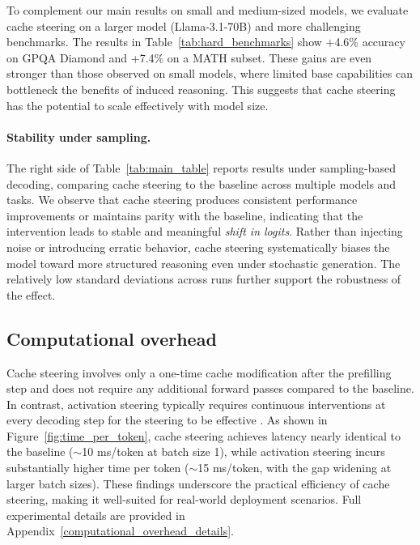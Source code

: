 \documentclass{article} %
\begin{document}
To complement our main results on small and medium-sized models, we evaluate cache steering on a larger model (Llama-3.1-70B) and more challenging benchmarks. The results in Table~\ref{tab:hard_benchmarks} show +4.6\% accuracy on GPQA Diamond and +7.4\% on a MATH subset. These gains are even stronger than those observed on small models, where limited base capabilities can bottleneck the benefits of induced reasoning. This suggests that cache steering has the potential to scale effectively with model size. 





\paragraph{Stability under sampling.}
The right side of Table~\ref{tab:main_table} reports results under sampling-based decoding, comparing cache steering to the baseline across multiple models and tasks. We observe that cache steering produces consistent performance improvements or maintains parity with the baseline, indicating that the intervention leads to stable and meaningful \textit{shift in logits}. Rather than injecting noise or introducing erratic behavior, cache steering systematically biases the model toward more structured reasoning even under stochastic generation. The relatively low standard deviations across runs further support the robustness of the effect.

\subsection{Computational overhead} \label{robustness}

Cache steering involves only a one-time cache modification after the prefilling step and does not require any additional forward passes compared to the baseline. In contrast, activation steering typically requires continuous interventions at every decoding step for the steering to be effective \citep{wehner2025taxonomy}. As shown in Figure~\ref{fig:time_per_token}, cache steering achieves latency nearly identical to the baseline ($\sim$10 ms/token at batch size 1), while activation steering incurs substantially higher time per token ($\sim$15 ms/token, with the gap widening at larger batch sizes). These findings underscore the practical efficiency of cache steering, making it well-suited for real-world deployment scenarios. Full experimental details are provided in Appendix~\ref{computational_overhead_details}.
\end{document}
